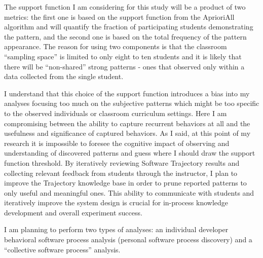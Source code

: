 The support function I am considering for this study will be a product of two metrics: the first one is based on the support function from the AprioriAll algorithm and will quantify the fraction of participating students demonstrating the pattern, and the second one is based on the total frequency of the pattern appearance. The reason for using two components is that the classroom ``sampling space'' is limited to only eight to ten students and it is likely that there will be ``non-shared'' strong patterns - ones that observed only within a data collected from the single student.

I understand that this choice of the support function introduces a bias into my analyses focusing too much on the subjective patterns which might be too specific to the observed individuals or classroom curriculum settings. Here I am compromising between the ability to capture recurrent behaviors at all and the usefulness and significance of captured behaviors. As I said, at this point of my research it is impossible to foresee the cognitive impact of observing and understanding  of discovered patterns and guess where I should draw the support function threshold. By iteratively reviewing Software Trajectory results and collecting relevant feedback from students through the instructor, I plan to improve the Trajectory knowledge base in order to prune reported patterns to only useful and meaningful ones. This ability to communicate with students and iteratively improve the system design is crucial for in-process knowledge development and overall experiment success.

I am planning to perform two types of analyses: an individual developer behavioral software process analysis (personal software process discovery) and a ``collective software process'' analysis.

